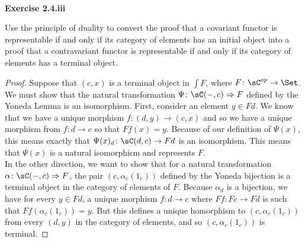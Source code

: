 \documentclass[main.tex]{subfiles}
\begin{document}
\paragraph{}
\textbf{Exercise 2.4.iii}

\begin{exercise}
Use the principle of duality to convert the proof that a covariant functor is
representable if and only if its category of elements has an initial object
into a proof that a contravariant functor is representable if and only if its
category of elements has a terminal object.
\end{exercise}
\begin{proof}
Suppose that $(c,x)$ is a terminal object in $\int F$, where $F\colon \sC^{op}
\rightarrow \Set$. We must show that the natural transformation $\Psi\colon \sC(-,c)
\Rightarrow F$ defined by the Yoneda Lemma is an isomorphism. First, consider
an element $y \in Fd$. We know that we have a unique morphism $f\colon (d,y)
\rightarrow (c,x)$ and so we have a unique morphism from $f\colon d \rightarrow c$
so that $Ff(x) = y$.  Because of our definition of $\Psi(x)$, this means
exactly that $\Psi(x)_d\colon \sC(d,c) \rightarrow Fd$ is an isomorphism. This means
that $\Psi(x)$ is a natural isomorphism and represents $F$.
\\

In the other direction, we want to show that for a natural transformation
$\alpha\colon \sC(-,c) \Rightarrow F$, the pair $(c,\alpha_c(1_c))$ defined by the
Yoneda bijection is a terminal object in the category of elements of $F$.
Because $\alpha_d$ is a bijection, we have for every $y \in Fd$, a unique
morphism $f\colon d \rightarrow c$ where $Ff\colon Fc \rightarrow Fd$ is such that
$Ff(\alpha_c(1_c)) = y$. But this defines a unique homorphism to $(c,
\alpha_c(1_c))$ from every $(d,y)$ in the category of elements, and so $(c,
\alpha_c(1_c))$ is terminal. 
\end{proof}
\end{document}
